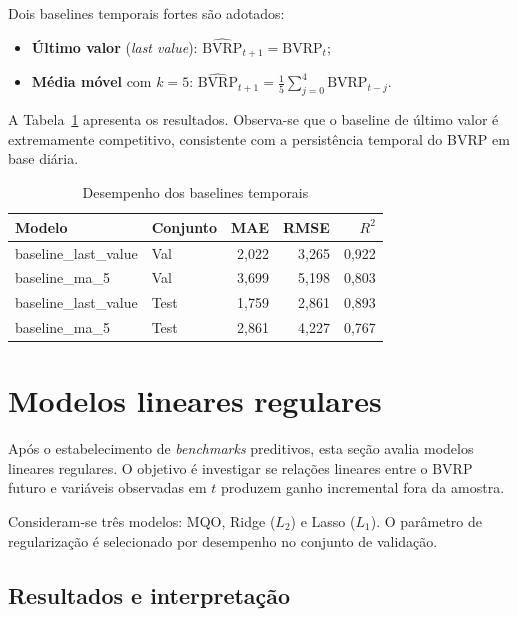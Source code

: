 Dois baselines temporais fortes são adotados:
\begin{itemize}
    \item \textbf{Último valor} (\textit{last value}):
    $\widehat{\text{BVRP}}_{t+1} = \text{BVRP}_{t}$;
    \item \textbf{Média móvel} com $k=5$:
    $\widehat{\text{BVRP}}_{t+1} = \tfrac{1}{5}\sum_{j=0}^{4}\text{BVRP}_{t-j}$.
\end{itemize}

A Tabela~\ref{tab:cap6_baselines} apresenta os resultados. Observa-se que o
baseline de último valor é extremamente competitivo, consistente com a persistência
temporal do BVRP em base diária.

\begin{table}[H]
\centering
\caption{Desempenho dos baselines temporais}
\label{tab:cap6_baselines}
\footnotesize
\begin{tabular}{llrrr}
\toprule
Modelo & Conjunto & MAE & RMSE & $R^2$ \\
\midrule
baseline\_last\_value & Val  & 2{,}022 & 3{,}265 & 0{,}922 \\
baseline\_ma\_5       & Val  & 3{,}699 & 5{,}198 & 0{,}803 \\
baseline\_last\_value & Test & 1{,}759 & 2{,}861 & 0{,}893 \\
baseline\_ma\_5       & Test & 2{,}861 & 4{,}227 & 0{,}767 \\
\bottomrule
\end{tabular}
\end{table}

\section{Modelos lineares regulares}
\label{sec:cap6_linear}

Após o estabelecimento de \textit{benchmarks} preditivos, esta seção avalia modelos
lineares regulares. O objetivo é investigar se relações lineares entre o BVRP futuro
e variáveis observadas em $t$ produzem ganho incremental fora da amostra.

Consideram-se três modelos: MQO, Ridge ($L_2$) e Lasso ($L_1$). O parâmetro de
regularização é selecionado por desempenho no conjunto de validação.

\subsection{Resultados e interpretação}
\label{subsec:cap6_linear_results}

